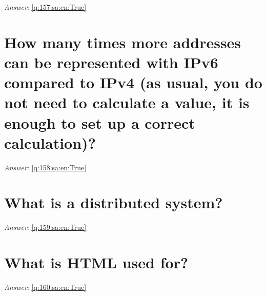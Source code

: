 \documentclass[a4paper,11pt,oneside]{book}
\begin{document}
\begin{sloppypar}
\vspace{2cm}

\noindent\makebox[\textwidth]{\hrulefill}

\vspace{1cm}

\textit{Answer}: \autoref{q:157:sa:en:True}



\section{How many times more addresses can be represented with IPv6 compared to IPv4 (as usual, you do not need to calculate a value, it is enough to set up a correct calculation)?}

\label{q:158:sa:en:False}

\vspace{2cm}

\noindent\makebox[\textwidth]{\hrulefill}

\vspace{1cm}

\textit{Answer}: \autoref{q:158:sa:en:True}



\section{What is a distributed system?}

\label{q:159:sa:en:False}

\vspace{2cm}

\noindent\makebox[\textwidth]{\hrulefill}

\vspace{1cm}

\textit{Answer}: \autoref{q:159:sa:en:True}



\section{What is HTML used for?}

\label{q:160:sa:en:False}

\vspace{2cm}

\noindent\makebox[\textwidth]{\hrulefill}

\vspace{1cm}

\textit{Answer}: \autoref{q:160:sa:en:True}




\end{sloppypar}
\end{document}
